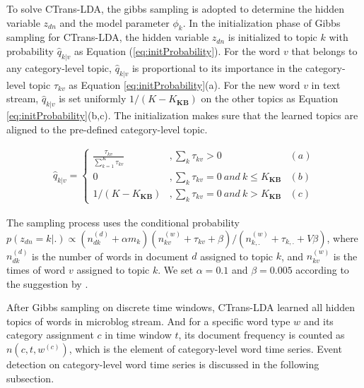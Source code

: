 \documentclass[runningheads,a4paper]{llncs}
\theoremstyle{exampstyle}
\begin{document}
To solve CTrans-LDA, the gibbs sampling is adopted to determine the hidden variable \(z_{dn}\) and the model parameter \(\phi_k\).
In the initialization phase of Gibbs sampling for CTrans-LDA, the hidden variable \(z_{dn}\) is initialized to topic \(k\) with probability \(\hat{q}_{k|v}\) as Equation (\ref{eq:initProbability}).
For the word \(v\) that belongs to any category-level topic, \(\hat{q}_{k|v}\) is proportional to its importance in the category-level topic \(\tau_{kv}\) as Equation \ref{eq:initProbability}(a). 
For the new word \(v\) in text stream, \(\hat{q}_{k|v}\) is   set uniformly \(1/(K-K_{\bm{KB}})\) on the other topics as Equation \ref{eq:initProbability}(b,c). 
The initialization makes sure that the learned topics are aligned to the pre-defined category-level topic.
\setlength{\abovedisplayskip}{0pt}
\setlength{\belowdisplayskip}{0pt}
\begin{scriptsize} 
\begin{equation}
\label{eq:initProbability}
\begin{aligned}
\hat{q}_{k|v}=
\left\{ \begin{aligned}
\frac{\tau_{kv}}{\sum_{k=1}^{K}\tau_{kv}} &,\sum_{k}\tau_{kv}>0 & (a)\\
0&, \sum_{k}\tau_{kv}=0 \ and \ k \leq K_{\bm{KB}} & (b)\\
1/(K-K_{\bm{KB}})&,\sum_{k}\tau_{kv}=0 \ and \ k > K_{\bm{KB}} & (c)
\end{aligned}\right.
\end{aligned}
\end{equation}
\end{scriptsize}

The sampling process uses the conditional probability \(p(z_{dn}=k|.)\propto (n^{(d)}_{dk}+\alpha m_k)(n^{(w)}_{kv}+\tau_{kv}+\beta)/(n^{(w)}_{k,.}+\tau_{k,.}+V\beta)\), where \(n^{(d)}_{dk}\) is the number of words in document \(d\) assigned to topic \(k\), and \(n^{(w)}_{kv}\) is the times of word \(v\) assigned to topic \(k\).
We set \(\alpha=0.1\) and \(\beta=0.005\) according to the suggestion by \cite{tang2014understanding}.


After Gibbs sampling on discrete time windows, CTrans-LDA learned all hidden topics of words in microblog stream.
And for a specific word type \(w\) and its category assignment \(c\) in time window \(t\), its document frequency is counted as \(n(c,t,w^{(c)})\), which is the element of category-level word time series.
Event detection on category-level word time series is discussed in the following subsection.
\end{document}
